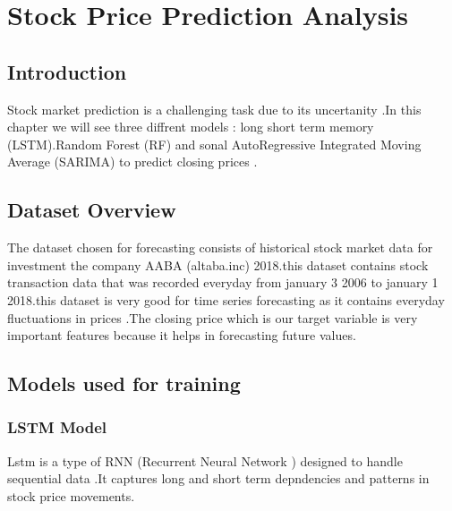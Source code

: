 \chapter{Stock Price Prediction Analysis}

\section{Introduction}
Stock market prediction is a challenging task due to its uncertanity .In this chapter we will see three diffrent models : long short term memory (LSTM).Random Forest (RF) and sonal AutoRegressive Integrated Moving Average (SARIMA) to predict closing prices .

\section{Dataset Overview}
The dataset chosen for forecasting consists of historical stock market data for investment the company AABA (altaba.inc) 2018.this dataset contains stock transaction data that was recorded everyday from january 3 2006 to january 1 2018.this dataset is very good for time series forecasting as it contains everyday fluctuations in prices .The closing price which is our target variable is very important features because it helps in forecasting future values.

\section{Models used for training}

\subsection{LSTM Model}
Lstm is a type of RNN (Recurrent Neural Network ) designed to handle sequential data .It captures long and short term depndencies and patterns in stock price movements.

